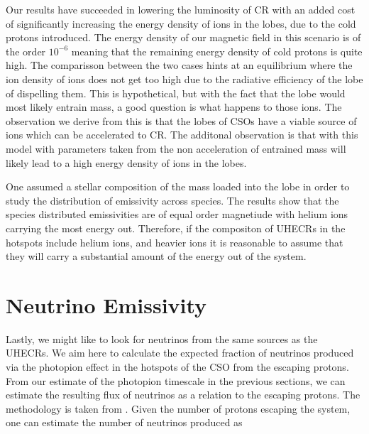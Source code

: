 Our results have succeeded in lowering the luminosity of CR with an added cost of significantly increasing the energy density of ions in the lobes, due to the cold protons introduced. The energy density of our magnetic field in this scenario is of the order $10^{-6}$ meaning that the remaining energy density of cold protons is quite high. The comparisson between the two cases hints at an equilibrium where the ion density of ions does not get too high due to the radiative efficiency of the lobe of dispelling them. This is hypothetical, but with the fact that the lobe would most likely entrain mass, a good question is what happens to those ions.
The observation we derive from this is that the lobes of CSOs have a viable source of ions which can be accelerated to CR. The additonal observation is that with this model with parameters taken from \cite{sullivan2024smallscale} the non acceleration of entrained mass will likely lead to a high energy density of ions in the lobes. 

One assumed a stellar composition of the mass loaded into the lobe in order to study the distribution of emissivity across species. The results show that the species distributed emissivities are of equal order magnetiude with helium ions carrying the most energy out. Therefore, if the compositon of UHECRs in the hotspots include helium ions, and heavier ions it is reasonable to assume that they will carry a substantial amount of the energy out of the system. 


 






\section{Neutrino Emissivity}
Lastly, we might like to look for neutrinos from the same sources as the UHECRs. We aim here to calculate the expected fraction of neutrinos produced via the photopion effect in the hotspots of the CSO from the escaping protons. From our estimate of the photopion timescale in the previous sections, we can estimate the resulting flux of neutrinos as a relation to the escaping protons. The methodology is taken from \cite{Oikonomou_2019}.
Given the number of protons escaping the system, one can estimate the number of neutrinos produced as

